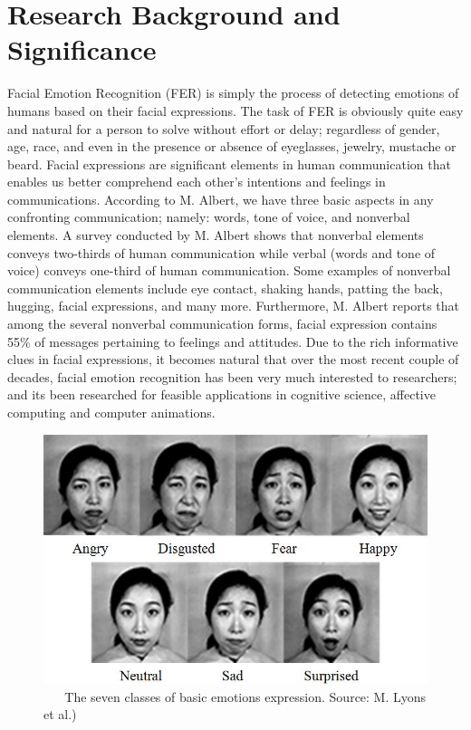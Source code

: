\documentclass[master]{thesis-uestc}
\begin{document}
\section{Research Background and Significance}
Facial Emotion Recognition (FER) is simply the process of detecting emotions of humans based on their facial expressions. The task of FER is obviously quite easy and natural for a person to solve without effort or delay; regardless of gender, age, race, and even in the presence or absence of eyeglasses, jewelry, mustache or beard\cite{Ivanovsky-2017}. Facial expressions are significant elements in human communication that enables us better comprehend each other's intentions and feelings in communications. According to M. Albert\cite{albert1968}, we have three basic aspects in any confronting communication; namely: words, tone of voice, and nonverbal elements. A survey conducted by M. Albert\cite{albert1968} shows that nonverbal elements conveys two-thirds of human communication while verbal (words and tone of voice) conveys one-third of human communication. Some examples of nonverbal communication elements include eye contact, shaking hands, patting the back, hugging, facial expressions, and many more. Furthermore, M. Albert\cite{albert1968} reports that among the several nonverbal communication forms, facial expression contains 55\% of messages pertaining to feelings and attitudes. Due to the rich informative clues in facial expressions, it becomes natural that over the most recent couple of decades, facial emotion recognition has been very much interested to researchers; and its been researched for feasible applications in cognitive science, affective computing and computer animations.

\begin{figure}[ht]
\includegraphics[width=5in]{pic/7_basic_emotions.png}
\caption{\,\,\,\,\,\,\,\,\,\,The seven classes of basic emotions expression. Source: M. Lyons et al.\cite{Michael-2017})}
\label{7_basic_emotions}
\end{figure}
\end{document}
